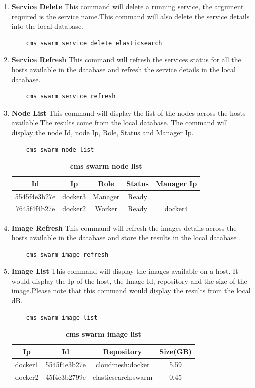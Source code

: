 \documentclass[9pt,twocolumn,twoside]{../../styles/osajnl}
\begin{document}
\begin{enumerate}
    \item \textbf{Service Delete}
    This command will delete a running service, the argument required is the service name.This command will also delete the service details into the local database.
    \begin{verbatim}
    cms swarm service delete elasticsearch
    \end{verbatim}    
    \item \textbf{Service Refresh}
    This command will refresh the services status for all the hosts available in the database and refresh the service details in the local database.
    \begin{verbatim}
    cms swarm service refresh
    \end{verbatim}       
    \item \textbf{Node List}
    This command will display the list of the nodes across the hosts available.The results come from the local database. The command will display the node Id, node Ip, Role, Status and Manager Ip.
    \begin{verbatim}
    cms swarm node list
    \end{verbatim} 
     \begin{table}[htbp]
     \caption{\bf cms swarm node list }
     \begin{tabular}{ccccc}
     \hline
      Id & Ip & Role &Status & Manager Ip\\
      \hline
      5545f4e3b27e &docker3& Manager&Ready&  \\
      7645f4f4b27e &docker2& Worker&Ready&docker4  \\
     \hline
     \end{tabular}
     \label{tab:tab8}
     \end{table}
     
    \item \textbf{Image Refresh}
    This command will refresh the images details across the hosts available in the database and store the results in the local database .
    \begin{verbatim}
    cms swarm image refresh
    \end{verbatim}     
    \item \textbf{Image List}
    This command will display the images available on a host.
    It would display the Ip of the host, the Image Id, repository and the size of the image.Please note that this command would display the results from the local dB.
    \begin{verbatim}
    cms swarm image list
    \end{verbatim}    
    \begin{table}[htbp]
     \caption{\bf cms swarm image list }
     \begin{tabular}{cccc}
     \hline
      Ip & Id & Repository & Size(GB)\\
      \hline
      docker1 & 5545f4e3b27e & cloudmesh:docker & 5.59 \\
      docker2 & 45f4e3b2799e & elasticsearch:swarm & 0.45 \\
     \hline
     \end{tabular}
     \label{tab:tab9}
     \end{table}
     

\end{enumerate}
\end{document}
